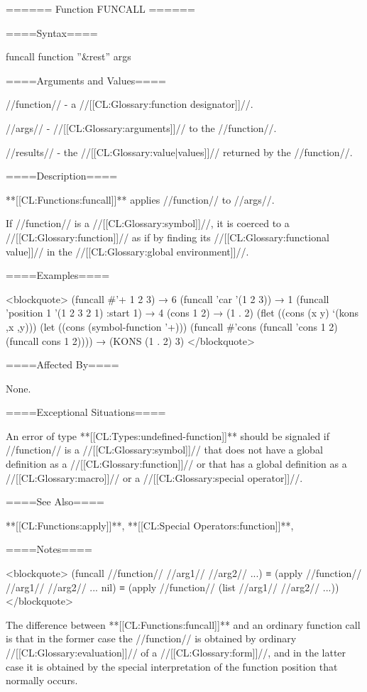 ====== Function FUNCALL ======

====Syntax====

\DefunWithValues funcall {function ''&rest'' args} {}

====Arguments and Values====

//function// - a //[[CL:Glossary:function designator]]//.

//args// - //[[CL:Glossary:arguments]]// to the //function//.

//results// - the //[[CL:Glossary:value|values]]// returned by the //function//.

====Description====

**[[CL:Functions:funcall]]** applies //function// to //args//.

If //function// is a //[[CL:Glossary:symbol]]//, it is coerced to a //[[CL:Glossary:function]]// as if by finding its //[[CL:Glossary:functional value]]// in the //[[CL:Glossary:global environment]]//.

====Examples====

<blockquote> (funcall #'+ 1 2 3) → 6 (funcall 'car '(1 2 3)) → 1 (funcall 'position 1 '(1 2 3 2 1) :start 1) → 4 (cons 1 2) → (1 . 2) (flet ((cons (x y) `(kons ,x ,y))) (let ((cons (symbol-function '+))) (funcall #'cons (funcall 'cons 1 2) (funcall cons 1 2)))) → (KONS (1 . 2) 3) </blockquote>

====Affected By====

None.

====Exceptional Situations====

An error of type **[[CL:Types:undefined-function]]** should be signaled if //function// is a //[[CL:Glossary:symbol]]// that does not have a global definition as a //[[CL:Glossary:function]]// or that has a global definition as a //[[CL:Glossary:macro]]// or a //[[CL:Glossary:special operator]]//.

====See Also====

**[[CL:Functions:apply]]**, **[[CL:Special Operators:function]]**, {\secref\Evaluation}

====Notes====

<blockquote> (funcall //function// //arg1// //arg2// ...) ≡ (apply //function// //arg1// //arg2// ... nil) ≡ (apply //function// (list //arg1// //arg2// ...)) </blockquote>

The difference between **[[CL:Functions:funcall]]** and an ordinary function call is that in the former case the //function// is obtained by ordinary //[[CL:Glossary:evaluation]]// of a //[[CL:Glossary:form]]//, and in the latter case it is obtained by the special interpretation of the function position that normally occurs.


